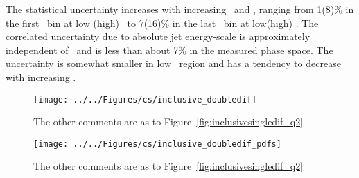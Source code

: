 The statistical uncertainty increases with increasing \etjetb~and \qsq, ranging from 1(8)\% in the first \qsq~bin at low (high) \etjetb~to 7(16)\% in the last \qsq~bin at low(high) \etjetb. The correlated uncertainty due to absolute jet energy-scale is approximately independent of \etjetb~and is less than about 7\% in the measured phase space. The uncertainty is somewhat smaller in low \etjetb~region and has a tendency to decrease with increasing \qsq.
\begin{figure}[p]
	\centering
		\texttt{[image: ../../Figures/cs/inclusive\_doubledif]}
	\caption{The other comments are as to Figure~\ref{fig:inclusivesingledif_q2}}
	\label{fig:inclusive_doubledif}
\end{figure}


\begin{figure}[p]
	\centering
		\texttt{[image: ../../Figures/cs/inclusive\_doubledif\_pdfs]}
  \caption{The other comments are as to Figure~\ref{fig:inclusivesingledif_q2}}
	\label{fig:inclusive_doubledif_rel}
\end{figure}

